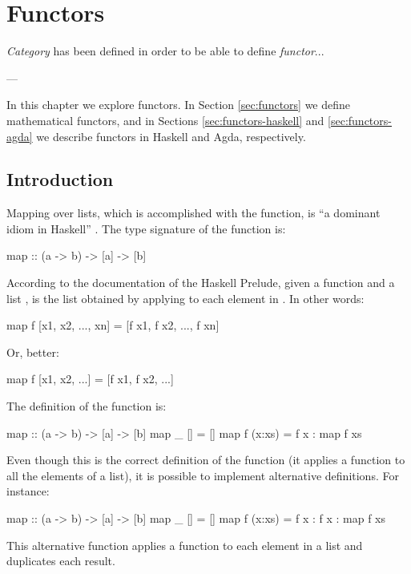 \chapter{Functors}
\label{chap:functors}

\epigraph{
  \emph{Category} has been defined in order to be able to
  define \emph{functor}...
}{---\textcite[18]{maclane-1998}}

In this chapter we explore functors. In Section \ref{sec:functors} we
define mathematical functors, and in Sections
\ref{sec:functors-haskell} and \ref{sec:functors-agda} we describe
functors in Haskell and Agda, respectively.

\section{Introduction}
\label{sec:functors-introduction}

Mapping over lists, which is accomplished with the 
function, is ``a dominant idiom in Haskell''
\parencite[146]{lipovaca-2011}. The type signature of the
 function is:
\begin{codehaskell}
map :: (a -> b) -> [a] -> [b]
\end{codehaskell}
According to the documentation of the Haskell Prelude, given a
function  and a list ,  is the list obtained by applying  to each
element in . In other words:
\begin{codehaskell}
map f [x1, x2, ..., xn] = [f x1, f x2, ..., f xn]
\end{codehaskell}
Or, better:
\begin{codehaskell}
map f [x1, x2, ...] = [f x1, f x2, ...]
\end{codehaskell}
The definition of the  function is:
\begin{codehaskell}
map :: (a -> b) -> [a] -> [b]
map _ []     = []
map f (x:xs) = f x : map f xs
\end{codehaskell}

Even though this is the correct definition of the 
function (it applies a function to all the elements of a list), it is
possible to implement alternative definitions. For instance:
\begin{codehaskell}
map :: (a -> b) -> [a] -> [b]
map _ []     = []
map f (x:xs) = f x : f x : map f xs
\end{codehaskell}
This alternative  function applies a function to each
element in a list and duplicates each result.

